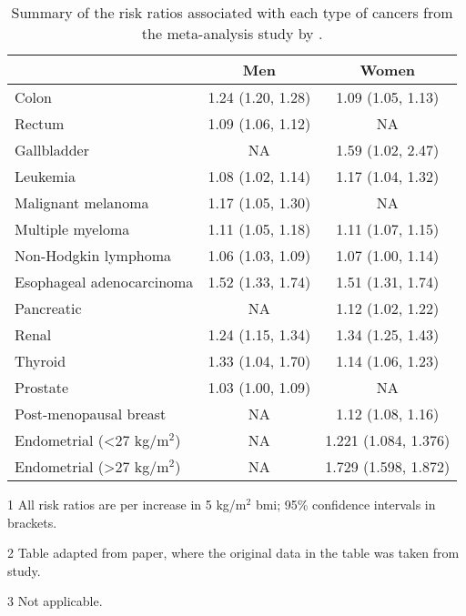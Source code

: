 \begin{table}[htb]
	\centering
	\begin{threeparttable}
		\caption{Summary of the risk ratios associated with each type of cancers from the meta-analysis study by \citet{Renehan2008}.}
		\label{tab:renehan_cancer_risks}
		\begin{tabular}{lcc}
													   & Men               & Women\\
			\hline
			\rule{0pt}{2.25ex}Colon                 & 1.24 (1.20, 1.28) & 1.09 (1.05, 1.13)\\
			Rectum                                  & 1.09 (1.06, 1.12) & NA\tnote{3}\\
			Gallbladder                             & NA                & 1.59 (1.02, 2.47)\\
			Leukemia                                & 1.08 (1.02, 1.14) & 1.17 (1.04, 1.32)\\
			Malignant melanoma                      & 1.17 (1.05, 1.30) & NA\\
			Multiple myeloma                        & 1.11 (1.05, 1.18) & 1.11 (1.07, 1.15)\\
			Non-Hodgkin lymphoma                    & 1.06 (1.03, 1.09) & 1.07 (1.00, 1.14)\\
			Esophageal adenocarcinoma               & 1.52 (1.33, 1.74) & 1.51 (1.31, 1.74)\\
			Pancreatic                              & NA                & 1.12 (1.02, 1.22)\\
			Renal                                   & 1.24 (1.15, 1.34) & 1.34 (1.25, 1.43)\\
			Thyroid                                 & 1.33 (1.04, 1.70) & 1.14 (1.06, 1.23)\\
			Prostate                                & 1.03 (1.00, 1.09) & NA\\
			Post-menopausal breast                  & NA                & 1.12 (1.08, 1.16)\\
			Endometrial (\textless{}27 kg/m$^2$)    & NA                & 1.221 (1.084, 1.376)\\
			Endometrial (\textgreater{}27 kg/m$^2$) & NA                & 1.729 (1.598, 1.872)\\
			\hline
			\hline
		\end{tabular}
		\begin{tablenotes}
			\begin{footnotesize}
				\item [1] All risk ratios are per increase in 5 kg/m$^2$ \gls{bmi}; 95\% confidence intervals in brackets.
				\item [2] Table adapted from \citet{Roberts2010} paper, where the original data in the table was taken from \citet{Renehan2008} study.
				\item [3] Not applicable.
			\end{footnotesize}
		\end{tablenotes}
	\end{threeparttable}
\end{table}

